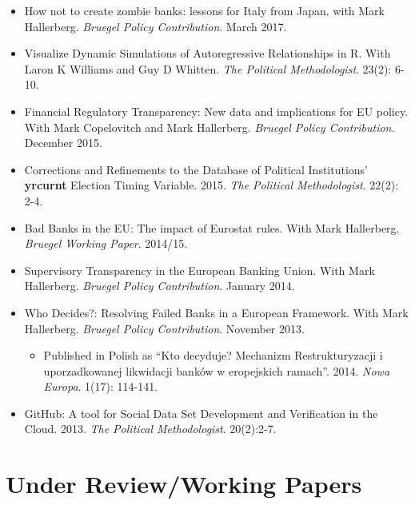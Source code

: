 \documentclass[a4paper]{article}
\begin{document}
\begin{itemize}

    \item How not to create zombie banks: lessons for Italy from Japan. with Mark Hallerberg. \emph{Bruegel Policy Contribution}. March 2017.

    \item Visualize Dynamic Simulations of Autoregressive Relationships in R. With Laron K Williams and Guy D Whitten. \emph{The Political Methodologist}. 23(2): 6-10.

    \item Financial Regulatory Transparency: New data and implications for EU policy. With Mark Copelovitch and Mark Hallerberg. \emph{Bruegel Policy Contribution}. December 2015.

    \item Corrections and Refinements to the Database of Political Institutions' \textbf{yrcurnt} Election Timing Variable. 2015. {\emph{The Political Methodologist}}. 22(2): 2-4.

    \item Bad Banks in the EU: The impact of Eurostat rules. With Mark Hallerberg. \emph{Bruegel Working Paper}. 2014/15.

    \item Supervisory Transparency in the European Banking Union. With Mark Hallerberg. {\emph{Bruegel Policy Contribution}}. January 2014.

    \item Who Decides?: Resolving Failed Banks in a European Framework. With Mark Hallerberg. {\emph{Bruegel Policy Contribution}}. November 2013.

      \begin{itemize}
        \item Published in Polish as ``Kto decyduje? Mechanizm Restrukturyzacji i uporzadkowanej likwidacji bank\'{o}w w eropejskich ramach''. 2014. \emph{Nowa Europa}. 1(17): 114-141.
      \end{itemize}

    \item GitHub: A tool for Social Data Set Development and Verification in the Cloud. 2013. {\emph{The Political Methodologist}}. 20(2):2-7.

\end{itemize}


\section*{Under Review/Working Papers}
\end{document}
